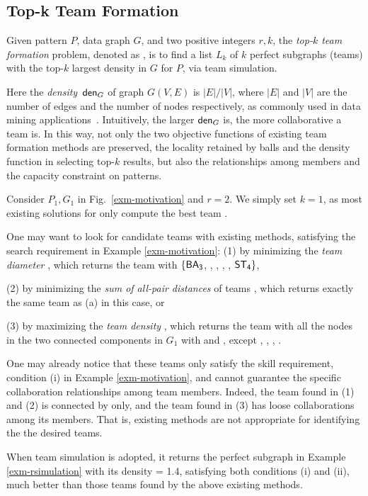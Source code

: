 
\subsection{Top-k Team Formation}
\label{subsec-teamF}

 Given pattern $P$, data graph $G$, and two positive integers $r, k$, the {\em top-$k$ team formation} problem, denoted as ,
is to find a list $L_{k}$ of $k$ perfect subgraphs (\ie teams) with the top-$k$ largest density in $G$ for $P$, via team simulation.

Here the {\em density}\, ${\mathsf{den}}_{G}$ of graph $G(V, E)$ is $|E|/|V|$, where $|E|$ and $|V|$ are the number of edges and the number of nodes respectively, as commonly used in data mining applications~\cite{maximumDenseSubgraph,EVMK12}.
Intuitively, the larger ${\mathsf{den}}_{G}$ is, the more collaborative a team is.
In this way, not only the two objective functions of existing team formation methods are preserved,
\ie the locality retained by balls and the density function in selecting top-$k$ results,
but also the relationships among members and the capacity constraint on patterns.


\begin{example}
\label{exa-teamF}
Consider $P_1, G_1$ in Fig.~\ref{exm-motivation} and $r=2$.
We simply set $k=1$, as most existing solutions for \teamF{} only compute the best team \cite{Lappas09,ArisLuca12,GajewarS12,realTeamForm13,SamikKVM12}.

One may want to look for candidate teams with existing methods, satisfying the search requirement in Example \ref{exm-motivation}:
\ni(1) by minimizing the {\em team diameter} \cite{Lappas09},
which returns the team with $\{{\mathsf{BA_3}}$, , , , , ${\mathsf{ST_4}}\}$,

\ni(2) by minimizing the {\em sum of all-pair distances} of teams \cite{Kargar11},
which returns exactly the same team as (a) in this case, or 

\ni(3) by maximizing the {\em team density} \cite{GajewarS12}, which returns the team with all the nodes in the two connected components in $G_1$ with  and , except , , , .

One may already notice that these teams only satisfy the skill requirement, \ie condition (i) in Example \ref{exm-motivation}, and cannot guarantee  the specific collaboration relationships among team members.
Indeed, the team found in (1) and (2) is connected by  only, and the team found in (3) has loose collaborations among its members.
That is, existing methods are not appropriate for identifying the the desired teams.

When team simulation is adopted, it returns the perfect subgraph in Example \ref{exm-rsimulation} with its density = 1.4,
satisfying both conditions (i) and (ii), much better than those teams found by the above existing methods.
\end{example}

